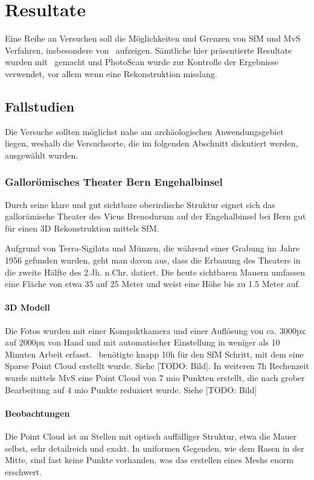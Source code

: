 \chapter{Resultate}
	Eine Reihe an Versuchen soll die Möglichkeiten und Grenzen von SfM und MvS Verfahren, insbesondere von \dronarch\ aufzeigen. Sämtliche hier präsentierte Resultate wurden mit \dronarch\ gemacht und PhotoScan wurde zur Kontrolle der Ergebnisse verwendet, vor allem wenn eine Rekonstruktion misslang.
	
	\section{Fallstudien}\label{res:fall}
		Die Versuche sollten möglichst nahe am archäologischen Anwendungsgebiet liegen, weshalb die Versuchsorte, die im folgenden Abschnitt diskutiert werden, ausgewählt wurden.
		\subsection{Gallorömisches Theater Bern Engehalbinsel}
			Durch seine klare und gut sichtbare oberirdische Struktur eignet sich das gallorämische Theater des Vicus Brenodurum auf der Engehalbinsel bei Bern gut für einen 3D Rekonstruktion mittels SfM.
			
			Aufgrund von Terra-Sigilata und Münzen, die während einer Grabung im Jahre 1956 gefunden wurden, geht man davon aus, dass die Erbauung des Theaters in die zweite Hälfte des 2.Jh. n.Chr. datiert. Die heute sichtbaren Mauern umfassen eine Fläche von etwa 35 auf 25 Meter und weist eine Höhe bis zu 1.5 Meter auf.	
							
			\subsubsection{3D Modell}
				Die Fotos wurden mit einer Kompaktkamera und einer Auflösung von ca. 3000px auf 2000px von Hand und mit automatischer Einstellung in weniger als 10 Minuten Arbeit erfasst.
				\dronarch\ benötigte knapp 10h für den SfM Schritt, mit dem eine Sparse Point Cloud erstellt wurde. Siehe [TODO: Bild].
				In weiteren 7h Rechenzeit wurde mittels MvS eine Point Cloud von 7 mio Punkten erstellt, die nach grober Bearbeitung auf 4 mio Punkte reduziert wurde. Siehe [TODO: Bild]

			\subsubsection{Beobachtungen}
				Die Point Cloud ist an Stellen mit optisch auffälliger Struktur, etwa die Mauer selbst, sehr detailreich und exakt. In uniformen Gegenden, wie dem Rasen in der Mitte, sind fast keine Punkte vorhanden, was das erstellen eines Meshs enorm erschwert.
				
